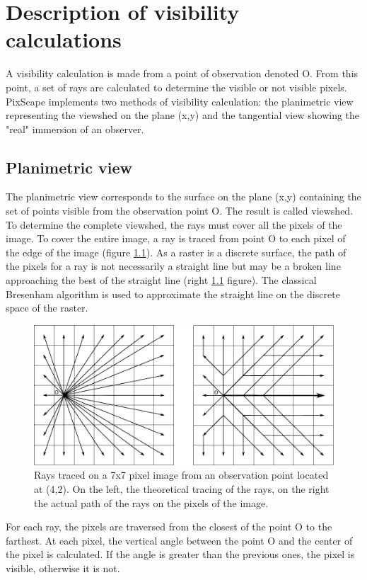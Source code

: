 \documentclass{report}
\begin{document}
\chapter{Description of visibility calculations}
\label{principles}
A visibility calculation is made from a point of observation denoted O. From this point, a set of rays are calculated to determine the visible or not visible pixels.
PixScape implements two methods of visibility calculation: the planimetric view representing the viewshed on the plane (x,y) and the tangential view showing the "real" immersion of an observer.

\section{Planimetric view}
The planimetric view corresponds to the surface on the plane (x,y) containing the set of points visible from the observation point O. The result is called viewshed.
To determine the complete viewshed, the rays must cover all the pixels of the image.
To cover the entire image, a ray is traced from point O to each pixel of the edge of the image (figure \ref{grid}). As a raster is a discrete surface, the path of the pixels for a ray is not necessarily a straight line but may be a broken line approaching the best of the straight line (right \ref{grid} figure). The classical Bresenham algorithm is used to approximate the straight line on the discrete space of the raster.

\begin{figure}[H]
	\includegraphics[scale=0.8]{img/grid.pdf} 
	\caption{Rays traced on a 7x7 pixel image from an observation point located at (4,2). On the left, the theoretical tracing of the rays, on the right the actual path of the rays on the pixels of the image.}
	\label{grid}
\end{figure}

For each ray, the pixels are traversed from the closest of the point O to the farthest. At each pixel, the vertical angle between the point O and the center of the pixel is calculated. If the angle is greater than the previous ones, the pixel is visible, otherwise it is not.
\end{document}
